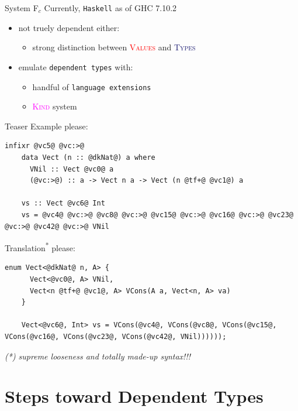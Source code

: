 \documentclass[xcolor={usenames,dvipsnames}]{beamer}
\newcommand{\htycon}[1]{\textcolor{MidnightBlue}{\textsc{#1}}}
\newcommand{\hvalcon}[1]{\textcolor{Red}{\textsc{#1}}}
\newcommand{\hkind}[1]{\textcolor{Fuchsia}{\textsc{#1}}}
\begin{document}
\begin{frame}[fragile]{System F$_c$}
  Currently, \texttt{Haskell} as of GHC 7.10.2
  \begin{itemize}
    \item not truely dependent either:
    \pause
      \begin{itemize}
        \item strong distinction between \hvalcon{Values} and \htycon{Types}
      \end{itemize}
    \pause
    \item emulate \texttt{dependent types} with:
      \begin{itemize}
        \item handful of \texttt{language extensions}
        \pause
        \item \hkind{Kind} system
      \end{itemize}
  \end{itemize}
\end{frame}

\begin{frame}[fragile]{Teaser}
  Example please:
  \begin{lstlisting}[style=hask]
    infixr @vc5@ @vc:>@
    data Vect (n :: @dkNat@) a where
      VNil :: Vect @vc0@ a
      (@vc:>@) :: a -> Vect n a -> Vect (n @tf+@ @vc1@) a

    vs :: Vect @vc6@ Int
    vs = @vc4@ @vc:>@ @vc8@ @vc:>@ @vc15@ @vc:>@ @vc16@ @vc:>@ @vc23@ @vc:>@ @vc42@ @vc:>@ VNil
  \end{lstlisting}

  \pause
  Translation\textsuperscript{*} please:
  \begin{lstlisting}[style=hask]
    enum Vect<@dkNat@ n, A> {
      Vect<@vc0@, A> VNil,
      Vect<n @tf+@ @vc1@, A> VCons(A a, Vect<n, A> va)
    }

    Vect<@vc6@, Int> vs = VCons(@vc4@, VCons(@vc8@, VCons(@vc15@, VCons(@vc16@, VCons(@vc23@, VCons(@vc42@, VNil))))));
  \end{lstlisting}
  \textit{\tiny{(*) supreme looseness and totally made-up syntax!!!}}
\end{frame}


\section{Steps toward Dependent Types}
\end{document}
